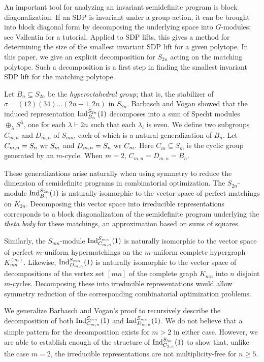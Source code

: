 \documentclass[12pt]{amsart}
\numberwithin{theorem}{section}
\newcommand{\Ind}{\textup{Ind}}
\newcommand{\wreath}{\textup{ wr }}
\begin{document}
An important tool for analyzing an invariant semidefinite program is block diagonalization.
If an SDP is invariant under a group action, it can be brought into block diagonal form by decomposing the underlying space into $G$-modules; see Vallentin \cite{vallentin2009symmetry} for a tutorial.
Applied to SDP lifts, this gives a method for determining the size of the smallest invariant SDP lift for a given polytope.
In this paper, we give an explicit decomposition for $S_{2n}$ acting on the matching polytope.
Such a decomposition is a first step in finding the smallest invariant SDP lift for the matching polytope.

Let $B_n \subseteq S_{2n}$ be the {\em hyperoctahedral group}; that is, the stabilizer of $\sigma = (12)(34)\ldots (2n-1,2n)$ in $S_{2n}$. Barbasch and Vogan \cite{bv} showed that the induced representation $\Ind_{B_n}^{S_{2n}}(1)$ decomposes into a sum of Specht modules $\oplus_\lambda S^\lambda$, one for each $\lambda \vdash 2n$ such that each $\lambda_i$ is even.
We define two subgroups $C_{m,n}$ and $D_{m,n}$ of $S_{mn}$, each of which is a natural generalization of $B_n$. 
Let $C_{m,n} = S_n \wreath S_m$ and $D_{m,n} = S_n \wreath C_m$. Here $C_m \subseteq S_m$ is the cyclic group generated by an $m$-cycle. When $m=2$, $C_{m,n} = D_{m,n} = B_n$.

These generalizations arise naturally when using symmetry to reduce the dimension of semidefinite programs in combinatorial optimization. The $S_{2n}$-module $\Ind_{B_n}^{S_{2n}}(1)$ is naturally isomorphic to the vector space of perfect matchings on $K_{2n}$. Decomposing this vector space into irreducible representations corresponds to a block diagonalization of the semidefinite program underlying the {\em theta body} for these matchings, an approximation based on sums of squares.

Similarly, the $S_{mn}$-module $\Ind_{C_{m,n}}^{S_{mn}}(1)$ is naturally isomorphic to the vector space of perfect $m$-uniform hypermatchings on the $m$-uniform complete hypergraph $K^{(m)}_{mn}$. Likewise, $\Ind_{D_{m,n}}^{S_{mn}}(1)$ is naturally isomorphic to the vector space of decompositions of the vertex set $[mn]$ of the complete graph $K_{mn}$ into $n$ disjoint $m$-cycles. Decomposing these into irreducible representations would allow symmetry reduction of the corresponding combinatorial optimization problems.

We generalize Barbasch and Vogan's proof to recursively describe the decomposition of both $\Ind_{C_{m,n}}^{S_{mn}}(1)$ and $\Ind_{D_{m,n}}^{S_{mn}}(1)$. 
We do not believe that a simple pattern for the decomposition exists for $m > 2$ in either case.
However, we are able to establish enough of the structure of $\Ind_{C_{3,n}}^{S_{3n}}(1)$ to show that, unlike the case $m=2$,
the irreducible representations are not multiplicity-free for $n \ge 5$.
\end{document}
